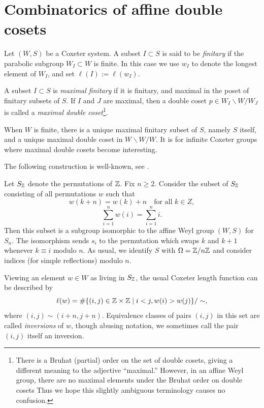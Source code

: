 \section{Combinatorics of affine double cosets}
\label{sec:combo}

\begin{defn}
    Let $(W,S)$ be a Coxeter system. A subset $I \subset S$ is said to be \textit{finitary} if the parabolic subgroup $W_I \subset W$ is finite. In this case we use $w_I$ to denote the longest element of $W_I$, and set $\ell(I):= \ell(w_I).$
\end{defn}

\begin{defn} \label{defn:maximalcoset}
    A subset $I \subset S$ is \emph{maximal finitary} if it is finitary, and maximal in the poset of finitary subsets of $S$. If $I$ and $J$ are maximal, then a double coset $p \in W_I \backslash W / W_J$ is called a \emph{maximal double coset}\footnote{There is a Bruhat (partial) order on the set of double cosets, giving a different meaning to the adjective ``maximal.'' However, in an affine Weyl group, there are no maximal elements under the Bruhat order on double cosets Thus we hope this slightly ambiguous terminology causes no confusion.}.
\end{defn}

\begin{remark} When $W$ is finite, there is a unique maximal finitary subset of $S$, namely $S$ itself, and a unique maximal double coset in $W \backslash W / W$. It is for infinite Coxeter groups where maximal double cosets become interesting.
\end{remark}

The following construction is well-known, see \cite[Chapter 8.3]{BjornerBrenti}.

\begin{theorem} Let $S_{\mathbb{Z}}$ denote the permutations of $\mathbb{Z}$. Fix $n \ge 2$. Consider the subset of $S_{\mathbb{Z}}$ consisting of all permutations $w$ such that
\begin{equation} \label{periodic} w(k+n) = w(k)+n \quad \text{for all } k \in Z, \end{equation}
\begin{equation}\label{netzero} \sum_{i=1}^n w(i) = \sum_{i=1}^n i. \end{equation}
Then this subset is a subgroup isomorphic to the affine Weyl group $(W,S)$ for $S_n$. The isomorphism sends $s_i$ to the permutation which swaps $k$ and $k+1$ whenever $k \equiv i$ modulo $n$. As usual, we identify $S$ with  $\Omega =\mathbb{Z}/n\mathbb{Z}$ and consider indices (for simple reflections) modulo $n$.

Viewing an element $w \in W$ as living in $S_{\mathbb{Z}}$, the usual Coxeter length function can be described by
\begin{equation} \ell(w) = \# \{(i,j) \in \mathbb{Z} \times \mathbb{Z} \mid i < j, w(i) > w(j) \} / \sim, \end{equation} 
where $(i,j) \sim (i+n, j+n)$. Equivalence classes of pairs $(i,j)$ in this set are called \emph{inversions} of $w$, though abusing notation, we sometimes call the pair $(i,j)$ itself an inversion. \end{theorem}

